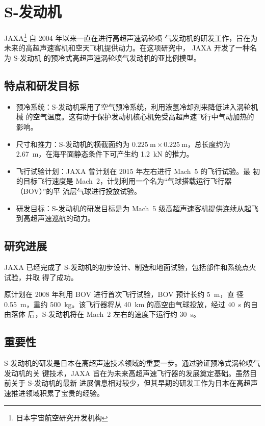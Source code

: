 \documentclass{pkuthesis}
\begin{document}
\section{S-发动机}
JAXA\footnote{日本宇宙航空研究开发机构} 自 2004 年以来一直在进行高超声速涡轮喷
气发动机的研发工作，旨在为未来的高超声速客机和空天飞机提供动力。在这项研究中，
JAXA 开发了一种名为 S-发动机 的预冷式高超声速涡轮喷气发动机的亚比例模型。

\subsection{特点和研发目标}

\begin{itemize}
    \item 预冷系统：S-发动机采用了空气预冷系统，利用液氢冷却剂来降低进入涡轮机械
    的空气温度。这有助于保护发动机核心机免受高超声速飞行中气动加热的影响。
    \item 尺寸和推力：S-发动机的横截面约为
    $\qty{0.225}{\meter} \times \qty{0.225}{\meter}$，总长度约为
    \qty{2.67}{\meter}，在海平面静态条件下可产生约
    \qty{1.2}{\kilo\newton} 的推力。
    \item 飞行试验计划：JAXA 曾计划在 2015 年左右进行 Mach~5 的飞行试验。最
    初的目标飞行速度是 Mach~2，计划利用一个名为“气球搭载运行飞行器（BOV）”的平
    流层气球进行投放试验。
    \item 研发目标：S-发动机的研发目标是为 Mach~5 级高超声速客机提供连续从起飞
    到高超声速巡航的动力。
\end{itemize}

\subsection{研究进展}

JAXA 已经完成了 S-发动机的初步设计、制造和地面试验，包括部件和系统点火试验，并取
得了成功。

原计划在 2008 年利用 BOV 进行首次飞行试验，BOV 预计长约 \qty{5}{\meter}，直
径 \qty{0.55}{\meter}，重约 \qty{500}{\kilogram}。该飞行器将从
\qty{40}{\kilo\meter} 的高空由气球投放，经过 \qty{40}{\second} 的自由落体
后，S-发动机将在 Mach~2 左右的速度下运行约 \qty{30}{\second}。

\subsection{重要性}

S-发动机的研发是日本在高超声速技术领域的重要一步。通过验证预冷式涡轮喷气发动机的关
键技术，JAXA 旨在为未来高超声速飞行器的发展奠定基础。虽然目前关于 S-发动机的最新
进展信息相对较少，但其早期的研发工作为日本在高超声速推进领域积累了宝贵的经验。
\end{document}
